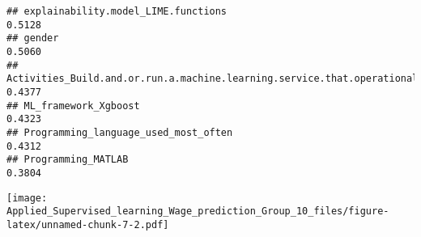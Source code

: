 \documentclass[
]{article}
\begin{document}
\begin{verbatim}
## explainability.model_LIME.functions                                                                          0.5128
## gender                                                                                                       0.5060
## Activities_Build.and.or.run.a.machine.learning.service.that.operationally.improves.my.product.or.workflows   0.4377
## ML_framework_Xgboost                                                                                         0.4323
## Programming_language_used_most_often                                                                         0.4312
## Programming_MATLAB                                                                                           0.3804
\end{verbatim}

\texttt{[image: Applied\_Supervised\_learning\_Wage\_prediction\_Group\_10\_files/figure-latex/unnamed-chunk-7-2.pdf]}
\end{document}
